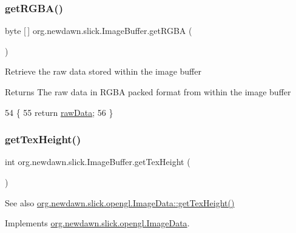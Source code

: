 \subsubsection{\texorpdfstring{get\+R\+G\+B\+A()}{getRGBA()}}
{\footnotesize\ttfamily byte \mbox{[}$\,$\mbox{]} org.\+newdawn.\+slick.\+Image\+Buffer.\+get\+R\+G\+BA (\begin{DoxyParamCaption}{ }\end{DoxyParamCaption})\hspace{0.3cm}{\ttfamily [inline]}}

Retrieve the raw data stored within the image buffer

\begin{DoxyReturn}{Returns}
The raw data in R\+G\+BA packed format from within the image buffer 
\end{DoxyReturn}

\begin{DoxyCode}
54                             \{
55         \textcolor{keywordflow}{return} \mbox{\hyperlink{classorg_1_1newdawn_1_1slick_1_1_image_buffer_a868ea7115032600267528b6894d8c8be}{rawData}};
56     \}
\end{DoxyCode}
\mbox{\label{classorg_1_1newdawn_1_1slick_1_1_image_buffer_a2a4f40e965941b68ce3c47c57ab330a3}} 
\subsubsection{\texorpdfstring{get\+Tex\+Height()}{getTexHeight()}}
{\footnotesize\ttfamily int org.\+newdawn.\+slick.\+Image\+Buffer.\+get\+Tex\+Height (\begin{DoxyParamCaption}{ }\end{DoxyParamCaption})\hspace{0.3cm}{\ttfamily [inline]}}

\begin{DoxySeeAlso}{See also}
\mbox{\hyperlink{interfaceorg_1_1newdawn_1_1slick_1_1opengl_1_1_image_data_a316891c94ba43967d0554378c7197324}{org.\+newdawn.\+slick.\+opengl.\+Image\+Data\+::get\+Tex\+Height()}} 
\end{DoxySeeAlso}


Implements \mbox{\hyperlink{interfaceorg_1_1newdawn_1_1slick_1_1opengl_1_1_image_data_a316891c94ba43967d0554378c7197324}{org.\+newdawn.\+slick.\+opengl.\+Image\+Data}}.


